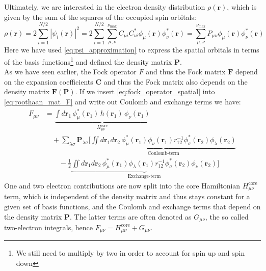 Ultimately, we are interested in the electron density distribution $\rho(\mathbf{r})$, which is given by the sum of the squares of the occupied spin orbitals: 
\begin{equation}
    \rho(\mathbf{r}) = 2 \sum_{i=1}^{N/2} |\psi_i(\mathbf{r})|^2 = 2 \sum_{i=1}^{N/2} \sum_{\mu,\nu}^{\nu_\text{max}} C_{\mu i} C_{\nu i}^* \phi_\mu(\mathbf{r}) \phi_\nu^*(\mathbf{r}) = \sum_{\mu,\nu}^{\nu_\text{max}} P_{\mu \nu} \phi_\mu(\mathbf{r}) \phi_\nu^*(\mathbf{r})
\end{equation}
Here we have used \autoref{eq:psi_approximation} to express the spatial orbitals in terms of the basis functions\footnote{We still need to multiply by two in order to account for spin up and spin down} and defined the density matrix $\mathbf{P}$.\\
As we have seen earlier, the Fock operator $F$ and thus the Fock matrix $\mathbf{F}$ depend on the expansion coefficients $\mathbf{C}$ and thus the Fock matrix also depends on the density matrix $\mathbf{F(P)}$. If we insert \autoref{eq:fock_operator_spatial} into \autoref{eq:roothaan_mat_F} and write out Coulomb and exchange terms we have: 
\begin{align}
    \label{eq:fock_full_eq_coul_ex}
        F_{\mu \nu} &= \underbrace{\int d\mathbf{r}_1\, \phi_\mu^*(\mathbf{r}_1)\, h(\mathbf{r}_1)\, \phi_\nu(\mathbf{r}_1) \nonumber}_{H_{\mu\nu}^\text{core}} \\
        &\quad + \sum_{\lambda \sigma} \mathbf{P}_{\lambda \sigma} \Bigg[
            \underbrace{\iint  d\mathbf{r}_1 d\mathbf{r}_2\, \phi_\mu^*(\mathbf{r}_1) \phi_\nu(\mathbf{r}_1) r_{12}^{-1} \phi_\sigma^*(\mathbf{r}_2) \phi_\lambda(\mathbf{r}_2) \nonumber}_{\text{Coulomb-term}} \\
            &\qquad - \frac{1}{2} \underbrace{\iint d\mathbf{r}_1 d\mathbf{r}_2\, \phi_\mu^*(\mathbf{r}_1) \phi_\lambda(\mathbf{r}_1) r_{12}^{-1} \phi_\sigma^*(\mathbf{r}_2) \phi_\nu(\mathbf{r}_2)}_{\text{Exchange-term}}
            \Bigg]
\end{align}
One and two electron contributions are now split into the core Hamiltonian $H_{\mu\nu}^\text{core}$ term, which is independent of the density matrix and thus stays constant for a given set of basis functions, and the Coulomb and exchange terms that depend on the density matrix $\mathbf{P}$. The latter terms are often denoted as $G_{\mu\nu}$, the so called two-electron integrals, hence $F_{\mu \nu} = H_{\mu\nu}^\text{core} + G_{\mu\nu}$.\\

